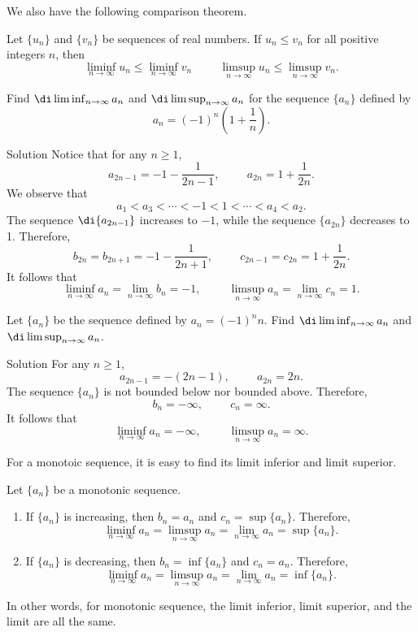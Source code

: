 We also have the following comparison theorem.
\begin{proposition}{}
Let $\{u_n\}$ and $\{v_n\}$ be sequences of real numbers. If $u_n\leq v_n$ for all positive integers $n$, then
\[\liminf_{n\to\infty}u_n\leq\liminf_{n\to \infty}v_n\hspace{1cm}\limsup_{n\to\infty}u_n\leq\limsup_{n\to \infty}v_n.\]
\end{proposition}



\begin{example}{}Find $\di\liminf_{n\to\infty}a_n$ and $\di \limsup_{n\to \infty}a_n$ for the sequence $\{a_n\}$   defined by
\[a_n=(-1)^n\left(1+\frac{1}{n}\right).\]

\end{example}
\begin{solution}{Solution}
Notice that for any $n\geq 1$,
\[
a_{2n-1}=-1-\frac{1}{2n-1},\hspace{1cm}a_{2n}=1+\frac{ 1}{2n}.
\] \bs We observe that
\[a_1<a_3<\cdots<-1<1<\cdots<a_4<a_2.\]The sequence $\di\{a_{2n-1}\}$ increases to $-1$, while the sequence $\{a_{2n}\}$ decreases to 1. 
Therefore,
\[b_{2n}=b_{2n+1}=-1-\frac{1}{2n+1},\hspace{1cm}c_{2n-1}=c_{2n}=1+\frac{1}{2n}.\]
It follows that
\[\liminf_{n\to\infty}a_n=\lim_{n\to\infty}b_n=-1,\hspace{1cm}
\limsup_{n\to\infty}a_n=\lim_{n\to\infty} c_n= 1.\]
\end{solution}

\begin{example}{}Let $\{a_n\}$ be the sequence defined by
$a_n=(-1)^nn$.
Find $\di\liminf_{n\to\infty}a_n$ and $\di \limsup_{n\to \infty}a_n$.
\end{example}
\begin{solution}{Solution}
For any $n\geq 1$,
\[
a_{2n-1}=-(2n-1),\hspace{1cm}a_{2n}=2n.
\]  The sequence
$\{a_n\}$ is not bounded below nor bounded above. Therefore,
\[b_n=-\infty,\hspace{1cm}c_n=\infty.\]
It follows that
\[\liminf_{n\to\infty}a_n= -\infty,\hspace{1cm}
 \limsup_{n\to\infty}a_n=\infty.\]
\end{solution}


For a monotoic sequence, it is easy to find its limit inferior and limit superior.
\begin{theorem}{}
Let $\{a_n\}$ be a monotonic sequence.
\begin{enumerate}[1.]
\item If $\{a_n\}$ is increasing, then $b_n=a_n$ and $c_n=\sup\{a_n\}$. Therefore,
\[\liminf_{n\to\infty}a_n=\limsup_{n\to\infty}a_n=\lim_{n\to\infty}a_n=\sup\{a_n\}.\]
\item  If $\{a_n\}$ is decreasing, then $b_n=\inf\{a_n\}$ and $c_n=a_n$. Therefore,
\[\liminf_{n\to\infty}a_n=\limsup_{n\to\infty}a_n=\lim_{n\to\infty}a_n=\inf\{a_n\}.\]

\end{enumerate}
\end{theorem}
In other words, for monotonic sequence, the limit inferior, limit superior, and the limit are all the same.

